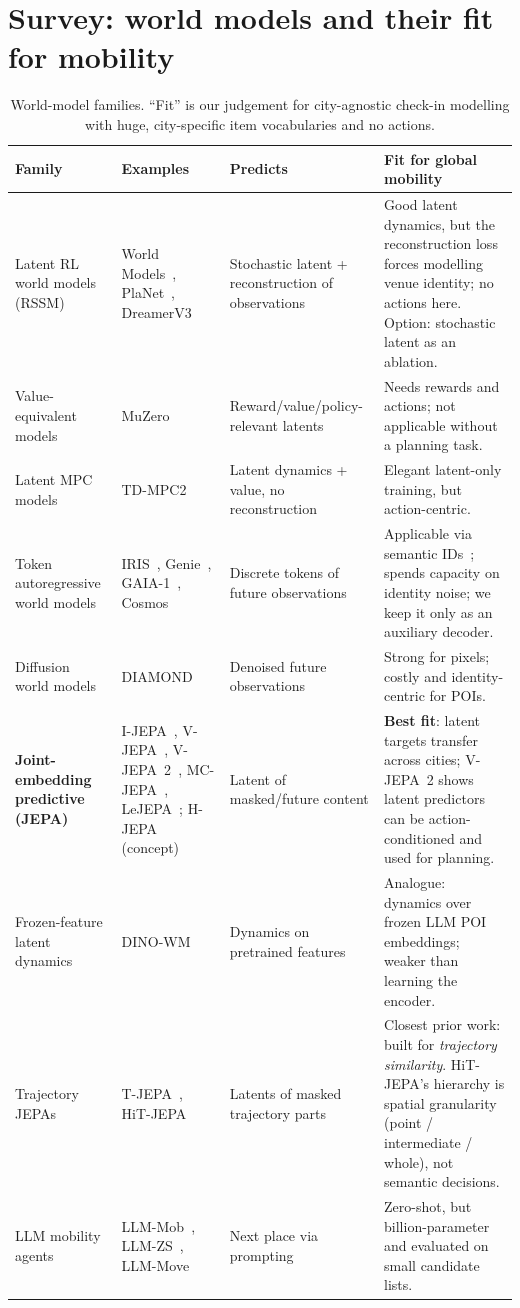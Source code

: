 \documentclass[10.5pt]{article}
\begin{document}
\section{Survey: world models and their fit for mobility}\label{sec:survey}
\begin{table}[h]
\centering\small
\caption{World-model families. ``Fit'' is our judgement for city-agnostic check-in modelling with huge, city-specific
item vocabularies and no actions.}
\begin{tabularx}{\linewidth}{>{\raggedright\arraybackslash}p{3.0cm}>{\raggedright\arraybackslash}p{3.4cm}>{\raggedright\arraybackslash}p{3.3cm}X}
\toprule
Family & Examples & Predicts & Fit for global mobility \\
\midrule
Latent RL world models (RSSM) & World Models~\cite{worldmodels}, PlaNet~\cite{planet}, DreamerV3~\cite{dreamerv3} & Stochastic latent + reconstruction of observations & Good latent dynamics, but the reconstruction loss forces modelling venue identity; no actions here. Option: stochastic latent as an ablation. \\
Value-equivalent models & MuZero~\cite{muzero} & Reward/value/policy-relevant latents & Needs rewards and actions; not applicable without a planning task. \\
Latent MPC models & TD-MPC2~\cite{tdmpc2} & Latent dynamics + value, no reconstruction & Elegant latent-only training, but action-centric. \\
Token autoregressive world models & IRIS~\cite{iris}, Genie~\cite{genie}, GAIA-1~\cite{gaia1}, Cosmos~\cite{cosmos} & Discrete tokens of future observations & Applicable via semantic IDs~\cite{tiger}; spends capacity on identity noise; we keep it only as an auxiliary decoder. \\
Diffusion world models & DIAMOND~\cite{diamond} & Denoised future observations & Strong for pixels; costly and identity-centric for POIs. \\
\textbf{Joint-embedding predictive (JEPA)} & I-JEPA~\cite{ijepa}, V-JEPA~\cite{vjepa}, V-JEPA~2~\cite{vjepa2}, MC-JEPA~\cite{mcjepa}, LeJEPA~\cite{lejepa}; H-JEPA (concept)~\cite{lecun2022path} & Latent of masked/future content & \textbf{Best fit}: latent targets transfer across cities; V-JEPA~2 shows latent predictors can be action-conditioned and used for planning. \\
Frozen-feature latent dynamics & DINO-WM~\cite{dinowm} & Dynamics on pretrained features & Analogue: dynamics over frozen LLM POI embeddings; weaker than learning the encoder. \\
\midrule
Trajectory JEPAs & T-JEPA~\cite{tjepa}, HiT-JEPA~\cite{hitjepa} & Latents of masked trajectory parts & Closest prior work: built for \emph{trajectory similarity}. HiT-JEPA's hierarchy is spatial granularity (point / intermediate / whole), not semantic decisions. \\
LLM mobility agents & LLM-Mob~\cite{llmmob}, LLM-ZS~\cite{llmzs}, LLM-Move~\cite{llmmove} & Next place via prompting & Zero-shot, but billion-parameter and evaluated on small candidate lists. \\
\bottomrule
\end{tabularx}
\end{table}
\end{document}
